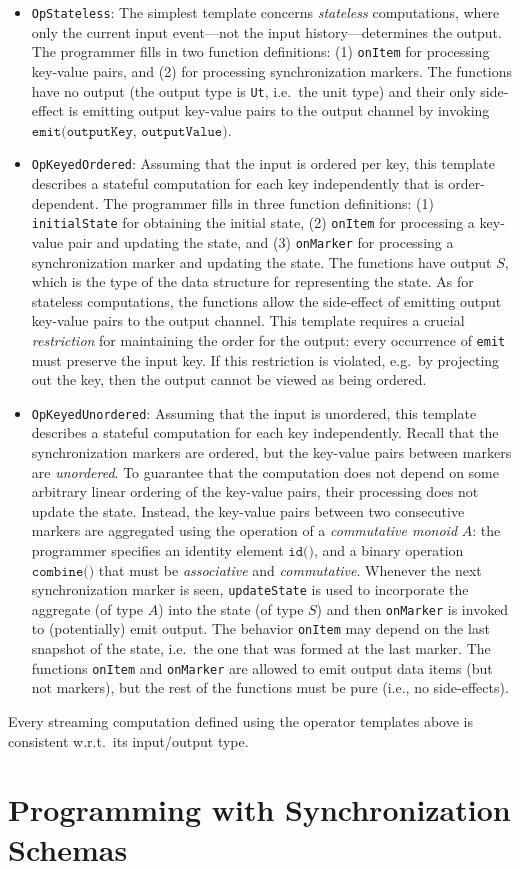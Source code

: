 \begin{itemize}
\item \texttt{OpStateless}:
The simplest template concerns \emph{stateless} computations, where only the current input event---not the input history---determines the output. The programmer fills in two function definitions: (1) \texttt{onItem} for processing key-value pairs, and (2)  for processing synchronization markers. The functions have no output (the output type is \texttt{Ut}, i.e.\ the unit type) and their only side-effect is emitting output key-value pairs to the output channel by invoking $\texttt{emit(outputKey, outputValue)}$.

\item \texttt{OpKeyedOrdered}:
Assuming that the input is ordered per key, this template describes a stateful computation for each key independently that is order-dependent. The programmer fills in three function definitions: (1) \texttt{initialState} for obtaining the initial state, (2) \texttt{onItem} for processing a key-value pair and updating the state, and (3) \texttt{onMarker} for processing a synchronization marker and updating the state. The functions have output $S$, which is the type of the data structure for representing the state. As for stateless computations, the functions allow the side-effect of emitting output key-value pairs to the output channel. This template requires a crucial \emph{restriction} for maintaining the order for the output: every occurrence of \texttt{emit} must preserve the input key. If this restriction is violated, e.g.\ by projecting out the key, then the output cannot be viewed as being ordered.

\item \texttt{OpKeyedUnordered}:
Assuming that the input is unordered, this template describes a stateful computation for each key independently. Recall that the synchronization markers are ordered, but the key-value pairs between markers are \emph{unordered}. To guarantee that the computation does not depend on some arbitrary linear ordering of the key-value pairs, their processing does not update the state. Instead, the key-value pairs between two consecutive markers are aggregated using the operation of a \emph{commutative monoid} $A$: the programmer specifies an identity element $\texttt{id()}$, and a binary operation $\texttt{combine()}$ that must be \emph{associative} and \emph{commutative}. Whenever the next synchronization marker is seen, \texttt{updateState} is used to incorporate the aggregate (of type $A$) into the state (of type $S$) and then \texttt{onMarker} is invoked to (potentially) emit output. The behavior \texttt{onItem} may depend on the last snapshot of the state, i.e.\ the one that was formed at the last marker. The functions \texttt{onItem} and \texttt{onMarker} are allowed to emit output data items (but not markers), but the rest of the functions must be pure (i.e., no side-effects).
\end{itemize}

\begin{theorem}
\normalfont
Every streaming computation defined using the operator templates above is consistent w.r.t.\ its input/output type.
\end{theorem}

\section{Programming with Synchronization Schemas}
